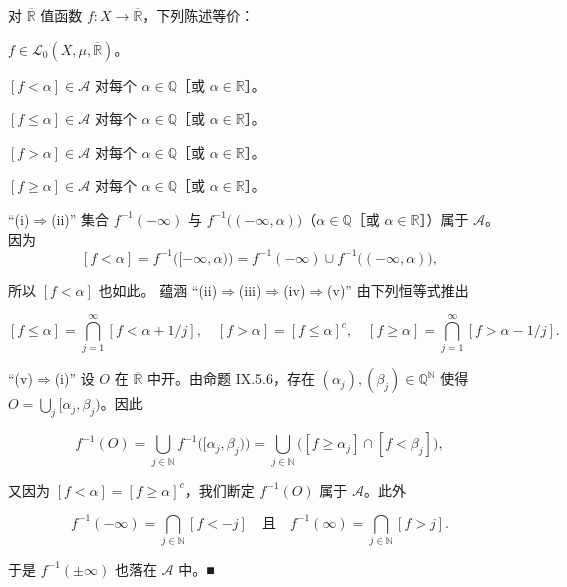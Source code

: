 \begin{proposition}

对 $ \overline{\mathbb{R}} $ 值函数 $ f: X \to \overline{\mathbb{R}} $，下列陈述等价：

\begin{subitems}
\item

$ f \in \mathcal{L}_0(X,\mu,\overline{\mathbb{R}}) $。

\item

$ [f < \alpha] \in \mathcal{A} $ 对每个 $ \alpha \in \mathbb{Q} $［或 $ \alpha \in \mathbb{R} $］。

\item

$ [f \le \alpha] \in \mathcal{A} $ 对每个 $ \alpha \in \mathbb{Q} $［或 $ \alpha \in \mathbb{R} $］。

\item

$ [f > \alpha] \in \mathcal{A} $ 对每个 $ \alpha \in \mathbb{Q} $［或 $ \alpha \in \mathbb{R} $］。

\item

$ [f \ge \alpha] \in \mathcal{A} $ 对每个 $ \alpha \in \mathbb{Q} $［或 $ \alpha \in \mathbb{R} $］。

\proofhead
“(i)$ \Rightarrow $(ii)” 集合 $ f^{-1}(-\infty) $ 与 $ f^{-1}\bigl((-\infty,\alpha)\bigr) $（$ \alpha \in \mathbb{Q} $［或 $ \alpha \in \mathbb{R} $］）属于 $ \mathcal{A} $。因为
\[
[f < \alpha] = f^{-1}\bigl([-\infty,\alpha)\bigr) = f^{-1}(-\infty) \cup f^{-1}\bigl((-\infty,\alpha)\bigr) ,
\]

所以 $ [f < \alpha] $ 也如此。
蕴涵 “(ii)$ \Rightarrow $(iii)$ \Rightarrow $(iv)$ \Rightarrow $(v)” 由下列恒等式推出

\[
[f \le \alpha] = \bigcap_{j=1}^{\infty} [f < \alpha + 1/j] , \quad [f > \alpha] = [f \le \alpha]^c , \quad [f \ge \alpha] = \bigcap_{j=1}^{\infty} [f > \alpha - 1/j] .
\]

“(v)$ \Rightarrow $(i)” 设 $ O $ 在 $ \overline{\mathbb{R}} $ 中开。由命题 IX.5.6，存在 $ (\alpha_j), (\beta_j) \in \mathbb{Q}^{\mathbb{N}} $ 使得 $ O = \bigcup_j [\alpha_j,\beta_j) $。因此

\[
f^{-1}(O) = \bigcup_{j \in \mathbb{N}} f^{-1}\bigl([\alpha_j,\beta_j)\bigr) = \bigcup_{j \in \mathbb{N}} \bigl([f \ge \alpha_j] \cap [f < \beta_j]\bigr) ,
\]

又因为 $ [f < \alpha] = [f \ge \alpha]^c $，我们断定 $ f^{-1}(O) $ 属于 $ \mathcal{A} $。此外

\[
f^{-1}(-\infty) = \bigcap_{j \in \mathbb{N}} [f < -j] \quad \text{且} \quad f^{-1}(\infty) = \bigcap_{j \in \mathbb{N}} [f > j] .
\]

于是 $ f^{-1}(\pm\infty) $ 也落在 $ \mathcal{A} $ 中。\nobreak\hspace{0.35em}■

\end{subitems}

\end{proposition}

